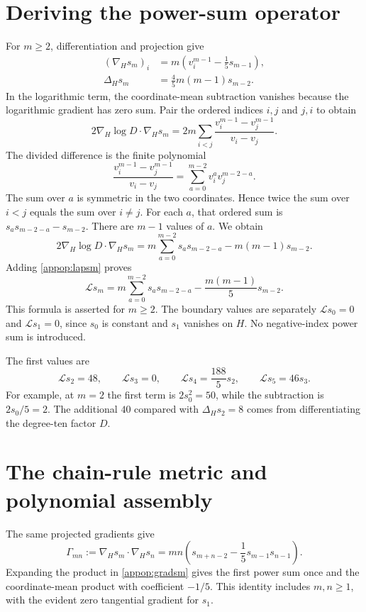 \section{Deriving the power-sum operator}
For $m\ge2$, differentiation and projection give
\begin{align}
(\nabla_Hs_m)_i
 &=m\left(v_i^{m-1}-\frac15s_{m-1}\right),\label{appop:gradsm}\\
\Delta_Hs_m
 &=\frac45m(m-1)s_{m-2}.\label{appop:lapsm}
\end{align}
In the logarithmic term, the coordinate-mean subtraction vanishes because the logarithmic gradient has zero sum. Pair the ordered indices $i,j$ and $j,i$ to obtain
\[
2\nabla_H\log D\cdot\nabla_Hs_m
=2m\sum_{i<j}\frac{v_i^{m-1}-v_j^{m-1}}{v_i-v_j}.
\]
The divided difference is the finite polynomial
\[
\frac{v_i^{m-1}-v_j^{m-1}}{v_i-v_j}
=\sum_{a=0}^{m-2}v_i^av_j^{m-2-a}.
\]
The sum over $a$ is symmetric in the two coordinates. Hence twice the sum over $i<j$ equals the sum over $i\ne j$. For each $a$, that ordered sum is $s_as_{m-2-a}-s_{m-2}$. There are $m-1$ values of $a$. We obtain
\[
2\nabla_H\log D\cdot\nabla_Hs_m
=m\sum_{a=0}^{m-2}s_as_{m-2-a}
-m(m-1)s_{m-2}.
\]
Adding \eqref{appop:lapsm} proves
\begin{equation}\label{appop:lsm}
\boxed{\mathcal Ls_m
=m\sum_{a=0}^{m-2}s_as_{m-2-a}
-\frac{m(m-1)}5s_{m-2}.}
\end{equation}
This formula is asserted for $m\ge2$. The boundary values are separately $\mathcal Ls_0=0$ and $\mathcal Ls_1=0$, since $s_0$ is constant and $s_1$ vanishes on $H$. No negative-index power sum is introduced.

The first values are
\begin{equation}\label{appop:firstoperator}
\mathcal Ls_2=48,\qquad
\mathcal Ls_3=0,\qquad
\mathcal Ls_4=\frac{188}{5}s_2,\qquad
\mathcal Ls_5=46s_3.
\end{equation}
For example, at $m=2$ the first term is $2s_0^2=50$, while the subtraction is $2s_0/5=2$. The additional $40$ compared with $\Delta_Hs_2=8$ comes from differentiating the degree-ten factor $D$.

\section{The chain-rule metric and polynomial assembly}
The same projected gradients give
\begin{equation}\label{appop:chainmetric}
\Gamma_{mn}:=\nabla_Hs_m\cdot\nabla_Hs_n
=mn\left(s_{m+n-2}-\frac15s_{m-1}s_{n-1}\right).
\end{equation}
Expanding the product in \eqref{appop:gradsm} gives the first power sum once and the coordinate-mean product with coefficient $-1/5$. This identity includes $m,n\ge1$, with the evident zero tangential gradient for $s_1$.

